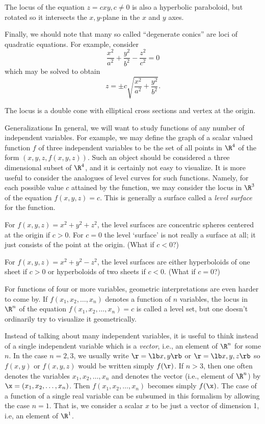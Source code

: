 The locus of the equation $z = cxy, c\not= 0$ is also a hyperbolic
paraboloid, but rotated so it intersects the $x,y$-plane in the
$x$ and $y$ axes. 
\medskip
\centerline{}
\medskip
Finally, we should note that many so called ``degenerate conics''
are loci of quadratic equations.   For example, consider
$$
    \frac{x^2}{a^2} + \frac{y^2}{b^2} - \frac{z^2}{c^2} = 0
$$
which may be solved to obtain
$$
   z = \pm c\sqrt{\frac{x^2}{a^2} + \frac{y^2}{b^2}}. 
$$

The locus is a double cone with elliptical cross sections and
vertex at the origin.  

\subhead Generalizations \endsubhead
In general, we will want to study functions of any number of independent
variables.   For example, we may define the graph of a scalar valued
function $f$ of three independent variables to be the set of all points
in $\R^4$ of the form $(x,y,z,f(x,y,z))$.   Such an object
should be considered a three dimensional subset of $\R^4$, and it is
certainly not easy to visualize.  It is more useful to consider the
analogues of level curves for such functions.  Namely, for each
possible value $c$ attained by the function, we may consider the
locus in $\R^3$ of the equation $f(x,y,z) = c$.  This is generally
a surface called a {\it level surface\/} for the function. 
%

\smallskip
{}
For $f(x, y, z) = x^2 + y^2 + z^2$, the level surfaces are
concentric spheres centered at the origin if $c > 0$.   For
$c = 0$ the level `surface' is not really a surface at all; it
just consists of the point at the origin.   (What if $c < 0$?) 

For $f(x,y,z) = x^2 + y^2 - z^2$, the level surfaces are either
hyperboloids of one sheet if $c > 0$ or hyperboloids of two sheets
if $c < 0$.  (What if $c = 0$?)
\endexample

For functions of four or more variables, geometric interpretations
are even harder to come by.  If $f(x_1,x_2,\dots,x_n)$ denotes
a function of $n$ variables, the locus in $\R^n$  of the
equation $f(x_1,x_2,\dots,x_n) = c$ is called a level set,
but one doesn't ordinarily try to visualize it geometrically.  

Instead of talking about many independent variables, it is useful
to think instead of a single independent variable which is a 
{\it vector}, i.e., an element of $\R^n$ for some $n$.   In the
case  $n = 2, 3$, we usually write $\r = \lb x,y \rb$ or
$\r = \lb x,y,z \rb$ so $f(x,y)$ or $f(x,y,z)$ would be written 
simply $f(\r)$.  If $n > 3$, then one often denotes the
variables $x_1, x_2, \dots, x_n$ and denotes the vector
(i.e., element of $\R^n$) by $\x = (x_1,x_2, \dots, x_n)$.
Then $f(x_1,x_2, \dots, x_n)$ becomes simply  $f(\x)$.
The case of a function of a single real variable can be subsumed
in this formalism by allowing the case $n =1$.  That is,
we consider a scalar $x$ to be just a vector of dimension 1,
i.e, an element of $\R^1$.

